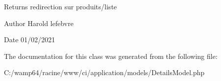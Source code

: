 \begin{DoxyReturn}{Returns}
redirection sur produits/liste 
\end{DoxyReturn}
\begin{DoxyAuthor}{Author}
Harold lefebvre 
\end{DoxyAuthor}
\begin{DoxyDate}{Date}
01/02/2021 
\end{DoxyDate}


The documentation for this class was generated from the following file\+:\begin{DoxyCompactItemize}
\item 
C\+:/wamp64/racine/www/ci/application/models/Details\+Model.\+php\end{DoxyCompactItemize}

